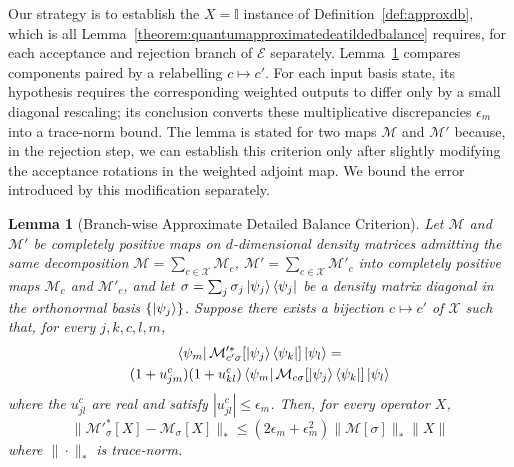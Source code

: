 \documentclass[aps,floatfix,10pt,amssymb,amsfont,amsmath,superscriptaddress,float,nofootinbib,longbibliography,nobalancelastpage,twocolumn]{revtex4-2}
\newtheorem{lemma}{Lemma}
\begin{document}
Our strategy is to establish the $X=\mathbb{I}$ instance of Definition~\ref{def:approxdb}, which is all Lemma~\ref{theorem:quantumapproximatedeatildedbalance} requires, for each acceptance and rejection branch of $\mathcal{E}$ separately. Lemma~\ref{lemma:1} compares components paired by a relabelling $c\mapsto c'$. For each input basis state, its hypothesis requires the corresponding weighted outputs to differ only by a small diagonal rescaling; its conclusion converts these multiplicative discrepancies $\epsilon_{m}$ into a trace-norm bound. The lemma is stated for two maps $\mathcal{M}$ and $\mathcal{M}'$ because, in the rejection step, we can establish this criterion only after slightly modifying the acceptance rotations in the weighted adjoint map. We bound the error introduced by this modification separately.

\begin{lemma}[Branch-wise Approximate Detailed Balance Criterion]
\label{lemma:1}
Let $\mathcal{M}$ and $\mathcal{M'}$ be completely positive maps on $d$-dimensional density matrices admitting the same decomposition $\mathcal{M} = \sum_{c\in\mathcal{X}} \mathcal{M}_c$, $\mathcal{M'} = \sum_{c\in\mathcal{X}} \mathcal{M'}_c$ into completely positive maps $\mathcal{M}_c$ and $\mathcal{M}'_c$, and let $\sigma = \sum_j \sigma_j \ket{\psi_j}\bra{\psi_j}$ be a density matrix diagonal in the orthonormal basis $\{\ket{\psi_j}\}$. Suppose there exists a bijection $c \mapsto c'$ of $\mathcal{X}$ such that, for every $j,k,c,l,m$,
\begin{multline}
    \bra{\psi_m}\mathcal{M}'^*_{c'\sigma}[\ket{\psi_j}\bra{\psi_k}]\ket{\psi_l}
    =\\(1+u^{c}_{jm})(1+ u^{c}_{kl})
    \bra{\psi_m}\mathcal{M}_{c\sigma}[\ket{\psi_j}\bra{\psi_k}]\ket{\psi_l}
    \label{eq:approximate_quantum_detailed_balance_condition}
\end{multline}
where the $u^{c}_{jl}$ are real and satisfy $|u^{c}_{jl}| \leq \epsilon_m$. Then, for every operator $X$,
 \begin{equation}
    \|\mathcal{M}'^*_{\sigma}[X]-\mathcal{M}_{\sigma}[X] \|_* \leq (2\epsilon_m+\epsilon_m^2)\|\mathcal{M}[\sigma]\|_*\|X\| \label{eq:lemma2output}
\end{equation}
where $\|\cdot\|_*$ is trace-norm.
\end{lemma}
\end{document}
